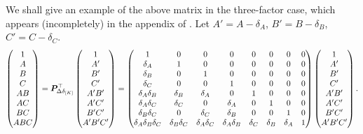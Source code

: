 \documentclass[12pt]{article}
\begin{document}
We shall give an example of the above matrix in the three-factor case, which appears (incompletely) in the appendix of \cite{zhao2021regression}. Let $A'=A-\delta_A$, $B'=B-\delta_B$, $C'=C-\delta_C$. 
\begin{align*}
    \begin{pmatrix}
    1\\
    A\\
    B\\
    C\\
    AB\\
    AC\\
    BC\\
    ABC
    \end{pmatrix} = {\boldsymbol{P}}_{\Delta\delta_{[K]}}^\top 
    \begin{pmatrix}
    1\\
    A'\\
    B'\\
    C'\\
    A'B'\\
    A'C'\\
    B'C'\\
    A'B'C'
    \end{pmatrix}=
    \begin{pmatrix}
    1        & 0 & 0 & 0 & 0 & 0 & 0 & 0 \\
    \delta_A & 1 & 0 & 0 & 0 & 0 & 0 & 0 \\
    \delta_B & 0 & 1 & 0 & 0 & 0 & 0 & 0 \\
    \delta_C & 0 & 0 & 1 & 0 & 0 & 0 & 0 \\
    \delta_A\delta_B & \delta_B & \delta_A & 0 & 1 & 0 & 0 & 0\\ 
    \delta_A\delta_C & \delta_C & 0 & \delta_A & 0 & 1 & 0 & 0\\ 
    \delta_B\delta_C & 0 & \delta_C & \delta_B & 0 & 0 & 1 & 0\\ 
    \delta_A\delta_B\delta_C & \delta_B\delta_C & \delta_A\delta_C & \delta_A\delta_B & \delta_C & \delta_B & \delta_A & 1\\
    \end{pmatrix}
    \begin{pmatrix}
    1\\
    A'\\
    B'\\
    C'\\
    A'B'\\
    A'C'\\
    B'C'\\
    A'B'C'
    \end{pmatrix}.
\end{align*}
\end{document}
